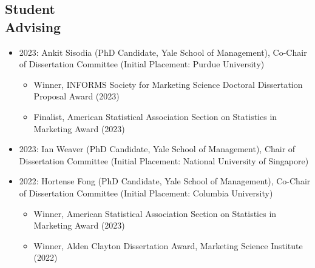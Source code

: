 \documentclass[margin, line, centered, 10pt]{res}
\begin{document}
\begin{resume}
\section{\sc Student \\ Advising}
\vspace{0.17in}
\begin{itemize}
\item 2023: Ankit Sisodia (PhD Candidate, Yale School of Management), Co-Chair of Dissertation Committee (Initial Placement: Purdue University)
\begin{itemize}
\item Winner, INFORMS Society for Marketing Science Doctoral Dissertation Proposal Award (2023)
\item Finalist, American Statistical Association Section on Statistics in Marketing Award (2023)
\end{itemize}
\item 2023: Ian Weaver (PhD Candidate, Yale School of Management), Chair of Dissertation Committee (Initial Placement: National University of Singapore)
\item 2022: Hortense Fong (PhD Candidate, Yale School of Management), Co-Chair of Dissertation Committee (Initial Placement: Columbia University)
\begin{itemize}
\item Winner, American Statistical Association Section on Statistics in Marketing Award (2023)
\item Winner, Alden Clayton Dissertation Award, Marketing Science Institute (2022)
\end{itemize}


\end{itemize}
\end{resume}
\end{document}
